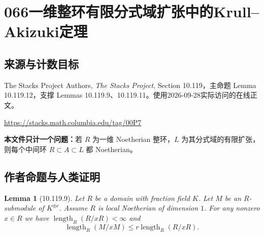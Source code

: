 \documentclass[UTF8,11pt]{ctexart}
\newtheorem*{lemma}{Lemma}
\theoremstyle{definition}
\begin{document}
\section*{066\quad 一维整环有限分式域扩张中的Krull--Akizuki定理}
\subsection*{来源与计数目标}
The Stacks Project Authors, \emph{The Stacks Project}, Section 10.119，主命题 Lemma 10.119.12，支撑 Lemmas 10.119.9、10.119.11。使用2026-09-28实际访问的在线正文。
\par\url{https://stacks.math.columbia.edu/tag/00P7}
\par\textbf{本文件只计一个问题：}若 $R$ 为一维 Noetherian 整环，$L$ 为其分式域的有限扩张，则每个中间环 $R\subset A\subset L$ 都 Noetherian。
\subsection*{作者命题与人类证明}
\begin{lemma}[10.119.9]
Let $R$ be a domain with fraction field $K$. Let $M$ be an $R$-submodule of $K^{\oplus r}$. Assume $R$ is local Noetherian of dimension $1$. For any nonzero $x\in R$ we have $\operatorname{length}_R(R/xR)<\infty$ and
\[\operatorname{length}_R(M/xM)\leq r\operatorname{length}_R(R/xR).\]
\end{lemma}
\end{document}
